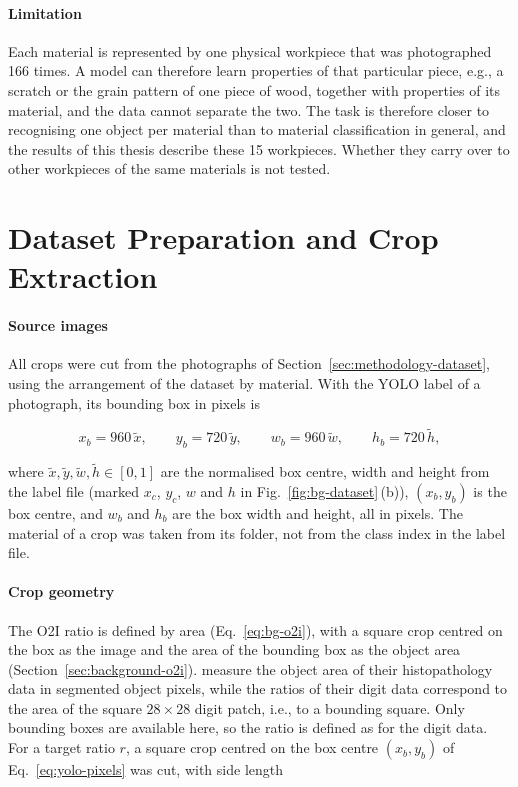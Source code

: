 \paragraph{Limitation}
Each material is represented by one physical workpiece that was photographed 166 times.
A model can therefore learn properties of that particular piece, e.g., a scratch or the
grain pattern of one piece of wood, together with properties of its material, and the
data cannot separate the two. The task is therefore closer to recognising one object
per material than to material classification in general, and the results of this thesis
describe these 15 workpieces.
Whether they carry over to other workpieces of the same materials is not tested.

\section{Dataset Preparation and Crop Extraction}
\label{sec:methodology-crops}

\paragraph{Source images}
All crops were cut from the photographs of Section~\ref{sec:methodology-dataset}, using
the arrangement of the dataset by material. With the YOLO label of a photograph, its
bounding box in pixels is

\begin{equation}
x_b = 960\,\tilde{x}, \qquad y_b = 720\,\tilde{y}, \qquad
w_b = 960\,\tilde{w}, \qquad h_b = 720\,\tilde{h},
\label{eq:yolo-pixels}
\end{equation}

where $\tilde{x}, \tilde{y}, \tilde{w}, \tilde{h} \in [0,1]$ are the normalised box
centre, width and height from the label file (marked $x_c$, $y_c$, $w$ and $h$ in
Fig.~\ref{fig:bg-dataset}\,(b)), $(x_b, y_b)$ is the box centre, and $w_b$ and $h_b$ are
the box width and height, all in pixels. The material of a crop was taken from its
folder, not from the class index in the label file.

\paragraph{Crop geometry}
The O2I ratio is defined by area (Eq.~\eqref{eq:bg-o2i}), with a square crop centred
on the box as the image and the area of the bounding box as the object area
(Section~\ref{sec:background-o2i}). \citet{pawlowski2019needles}
measure the object area of their histopathology data in segmented object pixels, while
the ratios of their digit data correspond to the area of the square $28 \times 28$
digit patch, i.e., to a bounding square. Only bounding boxes are available here, so the
ratio is defined as for the digit data. For a target ratio $r$, a square crop centred
on the box centre $(x_b, y_b)$ of Eq.~\eqref{eq:yolo-pixels} was cut, with side length

